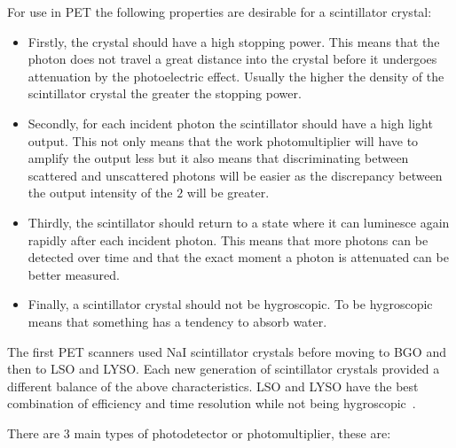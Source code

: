                 For use in \gls{PET} the following properties are desirable for a scintillator crystal:
                
                \begin{itemize}
                    \item Firstly, the crystal should have a high stopping power. This means that the photon does not travel a great distance into the crystal before it undergoes attenuation by the photoelectric effect. Usually the higher the density of the scintillator crystal the greater the stopping power.
                    
                    \item Secondly, for each incident photon the scintillator should have a high light output. This not only means that the work photomultiplier will have to amplify the output less but it also means that discriminating between scattered and unscattered photons will be easier as the discrepancy between the output intensity of the $2$ will be greater.
                    
                    \item Thirdly, the scintillator should return to a state where it can luminesce again rapidly after each incident photon. This means that more photons can be detected over time and that the exact moment a photon is attenuated can be better measured.
                    
                    \item Finally, a scintillator crystal should not be hygroscopic. To be hygroscopic means that something has a tendency to absorb water.
                \end{itemize}
                
                The first \gls{PET} scanners used \gls{NaI} scintillator crystals before moving to \gls{BGO} and then to \gls{LSO} and \gls{LYSO}. Each new generation of scintillator crystals provided a different balance of the above characteristics. \gls{LSO} and \gls{LYSO} have the best combination of efficiency and time resolution while not being hygroscopic~.
                
                There are $3$ main types of photodetector or photomultiplier, these are:
                
